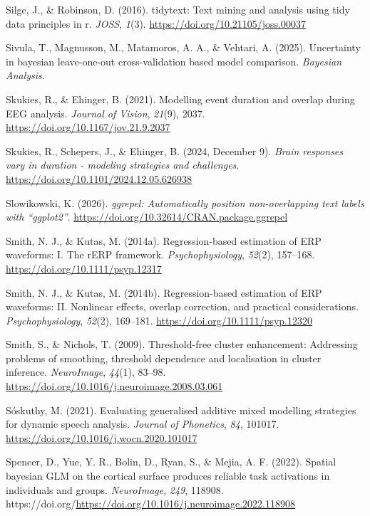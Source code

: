 \documentclass[
  doc,
  floatsintext,
  longtable,
  a4paper,
  nolmodern,
  notxfonts,
  notimes,
  colorlinks=true,linkcolor=blue,citecolor=blue,urlcolor=blue]{apa7}
\newlength{\cslhangindent}
\newenvironment{CSLReferences}[2] %
 {\begin{list}{}{%
  \setlength{\itemindent}{0pt}
  \setlength{\leftmargin}{0pt}
  \setlength{\parsep}{0pt}
  \ifodd #1
   \setlength{\leftmargin}{\cslhangindent}
   \setlength{\itemindent}{-1\cslhangindent}
  \fi
  \setlength{\itemsep}{#2\baselineskip}}}
 {\end{list}}
\begin{document}
\begin{CSLReferences}{1}{0}
Silge, J., \& Robinson, D. (2016). {tidytext}: Text mining and analysis
using tidy data principles in r. \emph{JOSS}, \emph{1}(3).
\url{https://doi.org/10.21105/joss.00037}

Sivula, T., Magnusson, M., Matamoros, A. A., \& Vehtari, A. (2025).
Uncertainty in bayesian leave-one-out cross-validation based model
comparison. \emph{Bayesian Analysis}.

Skukies, R., \& Ehinger, B. (2021). Modelling event duration and overlap
during {EEG} analysis. \emph{Journal of Vision}, \emph{21}(9), 2037.
\url{https://doi.org/10.1167/jov.21.9.2037}

Skukies, R., Schepers, J., \& Ehinger, B. (2024, December 9).
\emph{Brain responses vary in duration - modeling strategies and
challenges}. \url{https://doi.org/10.1101/2024.12.05.626938}

Slowikowski, K. (2026). \emph{{ggrepel}: Automatically position
non-overlapping text labels with {``{ggplot2}''}}.
\url{https://doi.org/10.32614/CRAN.package.ggrepel}

Smith, N. J., \& Kutas, M. (2014a). Regression{-}based estimation of ERP
waveforms: I. The rERP framework. \emph{Psychophysiology}, \emph{52}(2),
157--168. \url{https://doi.org/10.1111/psyp.12317}

Smith, N. J., \& Kutas, M. (2014b). Regression{-}based estimation of ERP
waveforms: II. Nonlinear effects, overlap correction, and practical
considerations. \emph{Psychophysiology}, \emph{52}(2), 169--181.
\url{https://doi.org/10.1111/psyp.12320}

Smith, S., \& Nichols, T. (2009). Threshold-free cluster enhancement:
Addressing problems of smoothing, threshold dependence and localisation
in cluster inference. \emph{NeuroImage}, \emph{44}(1), 83--98.
\url{https://doi.org/10.1016/j.neuroimage.2008.03.061}

Sóskuthy, M. (2021). Evaluating generalised additive mixed modelling
strategies for dynamic speech analysis. \emph{Journal of Phonetics},
\emph{84}, 101017. \url{https://doi.org/10.1016/j.wocn.2020.101017}

Spencer, D., Yue, Y. R., Bolin, D., Ryan, S., \& Mejia, A. F. (2022).
Spatial bayesian GLM on the cortical surface produces reliable task
activations in individuals and groups. \emph{NeuroImage}, \emph{249},
118908.
https://doi.org/\url{https://doi.org/10.1016/j.neuroimage.2022.118908}


\end{CSLReferences}
\end{document}
